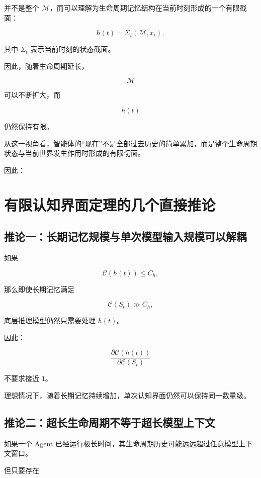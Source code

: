 并不是整个 $\mathcal{M}$，而可以理解为生命周期记忆结构在当前时刻形成的一个有限截面：

\[
h(t)
=
\Sigma_t(\mathcal{M},x_t),
\]

其中 $\Sigma_t$ 表示当前时刻的状态截面。

因此，随着生命周期延长，

\[
\mathcal{M}
\]

可以不断扩大，而

\[
h(t)
\]

仍然保持有限。

从这一视角看，智能体的``现在''不是全部过去历史的简单累加，而是整个生命周期状态与当前世界发生作用时形成的有限切面。

因此：

\begin{statementbox}
\centering
{}
\end{statementbox}


\section{有限认知界面定理的几个直接推论}

\subsection{推论一：长期记忆规模与单次模型输入规模可以解耦}

如果

\[
\mathcal{C}(h(t))
\leq
C_h,
\]

那么即使长期记忆满足

\[
\mathcal{C}(S_t)
\gg
C_h,
\]

底层推理模型仍然只需要处理 $h(t)$。

因此：

\[
\frac{\partial \mathcal{C}(h(t))}
{\partial \mathcal{C}(S_t)}
\]

不要求接近 $1$。

理想情况下，随着长期记忆持续增加，单次认知界面仍然可以保持同一数量级。


\subsection{推论二：超长生命周期不等于超长模型上下文}

如果一个 Agent 已经运行极长时间，其生命周期历史可能远远超过任意模型上下文窗口。

但只要存在

